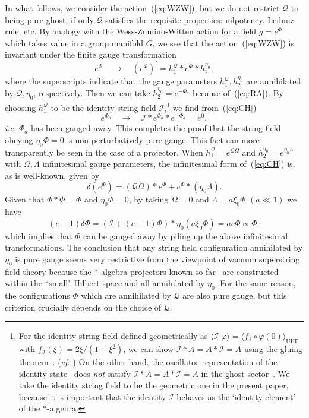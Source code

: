 \documentclass[a4paper,12pt]{article}
\newcommand{\cI}{\mathcal{I}}
\newcommand{\cQ}{\mathcal{Q}}
\begin{document}
In what follows, we consider the action~(\ref{eq:WZW}), but we do not restrict $\cQ$ to being pure 
ghost, if only $\cQ$ satisfies the requisite properties: nilpotency, Leibniz rule, etc. 
By analogy with the Wess-Zumino-Witten action for a field $g=e^{\Phi}$ which takes value in a 
group manifold $G$, we see that the action~(\ref{eq:WZW}) is invariant under the finite gauge transformation 
\begin{equation}
e^{\Phi}\quad\longrightarrow\quad (e^{\Phi})^{\prime}=h_1^{\cQ}*e^{\Phi}*h_2^{\eta_0}, \label{eq:CH}
\end{equation}
where the superscripts indicate that the gauge parameters 
$h_1^{\cQ},h_2^{\eta_0}$ are annihilated by $\cQ,\eta_0$, respectively. 
Then we can take $h_2^{\eta_0}=e^{-\Phi_a}$ because of~(\ref{eq:RA}). 
By choosing $h_1^{\cQ}$ to be the identity string field $\cI$,\footnote{For 
the identity string field defined geometrically as $\langle\cI |
\varphi\rangle=\langle f_{\cI}\circ\varphi(0)\rangle_{\mathrm{UHP}}$ with $f_{\cI}(\xi)=2\xi /(1-\xi^2)$, 
we can show $\cI *A=A*\cI=A$ using the gluing theorem~\cite{KiOh}. (\textit{cf.} \cite{Wedge}) 
On the other hand, the oscillator representation of the identity state~\cite{GJ} does \textit{not} 
satisfy $\cI *A=A*\cI=A$ in the ghost sector~\cite{Kishimoto}. We take the identity string field to be 
the geometric one in the present paper, because it is important that the identity $\cI$ behaves as the 
`identity element' of the $*$-algebra.} 
we find from~(\ref{eq:CH}) 
\[ e^{\Phi_a}\quad\longrightarrow\quad \cI *e^{\Phi_a}*e^{-\Phi_a}=e^0, \]
\textit{i.e.} $\Phi_a$ has been gauged away. This completes the proof 
that the string field obeying $\eta_0\Phi=0$ is non-perturbatively pure-gauge. 
This fact can more transparently be seen in the case of a projector. When $h_1^{\cQ}=e^{\cQ\Omega}$ 
and $h_2^{\eta_0}=e^{\eta_0\Lambda}$ with $\Omega,\Lambda$ infinitesimal gauge parameters, the infinitesimal 
form of~(\ref{eq:CH}) is, as is well-known, given by 
\begin{equation}
\delta (e^{\Phi})=(\cQ\Omega) *e^{\Phi}+e^{\Phi}*(\eta_0\Lambda). \label{eq:CJ}
\end{equation}
Given that $\Phi *\Phi=\Phi$ and $\eta_0\Phi=0$, by taking $\Omega=0$ and $\Lambda=a\xi_0\Phi$ 
$(a\ll 1)$ we have
\[ (e-1)\delta\Phi=\left(\cI+(e-1)\Phi\right) *\eta_0(a\xi_0\Phi)=ae\Phi\propto\Phi, \]
which implies that $\Phi$ can be gauged away by piling up the above infinitesimal transformations. 
The conclusion that any string field configuration annihilated by $\eta_0$ is pure gauge seems very 
restrictive from the viewpoint of vacuum superstring field theory because the $*$-algebra projectors 
known so far~\cite{GRSZ3,Schnabl} are constructed within the ``small"  Hilbert space and all annihilated 
by $\eta_0$. For the same reason, the configurations $\Phi$ which are annihilated by $\cQ$ are 
also pure gauge, but this criterion crucially depends on the choice of $\cQ$. 
\medskip
\end{document}
